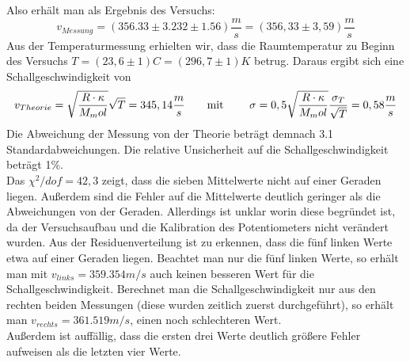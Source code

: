 \documentclass[12pt,a4paper]{article}
\begin{document}
	Also erhält man als Ergebnis des Versuchs:
	\begin{equation}
	v_{Messung} = (356.33 \pm 3.232 \pm 1.56)\frac{m}{s} = (356,33\pm 3,59) \frac{m}{s}
	\end{equation}
	Aus der Temperaturmessung erhielten wir, dass die Raumtemperatur zu Beginn des Versuchs $T = (23,6 \pm 1)C = (296,7 \pm 1)K$ betrug.
	Daraus ergibt sich eine Schallgeschwindigkeit von
	\begin{equation}
	v_{Theorie} =\sqrt{\frac{R\cdot\kappa}{M_mol}}\sqrt{T} = 345,14 \frac{m}{s} \text{\qquad mit \qquad}
	\sigma = 0,5 \sqrt{\frac{R\cdot\kappa}{M_mol}} \frac{\sigma_T}{\sqrt{T}} = 0,58 \frac{m}{s}
	\end{equation}
	Die Abweichung der Messung von der Theorie beträgt demnach 3.1 Standardabweichungen. Die relative Unsicherheit auf die Schallgeschwindigkeit beträgt 1\%.\\
	Das $\chi^2/dof=42,3$ zeigt, dass die sieben Mittelwerte nicht auf einer Geraden liegen. Außerdem sind die Fehler auf die Mittelwerte deutlich geringer als die Abweichungen von der Geraden. Allerdings ist unklar worin diese begründet ist, da der Versuchsaufbau und die Kalibration des Potentiometers nicht verändert wurden. Aus der Residuenverteilung ist zu erkennen, dass die fünf linken Werte etwa auf einer Geraden liegen. Beachtet man nur die fünf linken Werte, so erhält man mit $v_{links} = 359.354 m/s$ auch keinen besseren Wert für die Schallgeschwindigkeit.  Berechnet man die Schallgeschwindigkeit nur aus den rechten beiden Messungen (diese wurden zeitlich zuerst durchgeführt), so erhält man $v_{rechts} = 361.519 m/s$, einen noch schlechteren Wert.\\
	Außerdem ist auffällig, dass die ersten drei Werte deutlich größere Fehler aufweisen als die letzten vier Werte.
	
\end{document}
